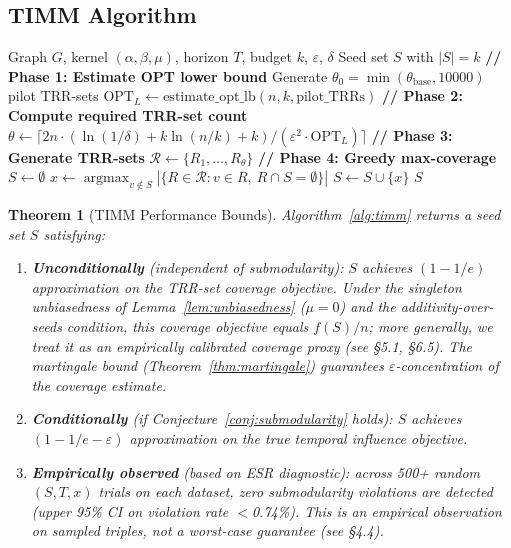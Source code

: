 \documentclass[10pt,conference]{IEEEtran}
\newtheorem{theorem}{Theorem}
\begin{document}
\subsection{TIMM Algorithm}

\begin{algorithm}[t]
\caption{TIMM}
\label{alg:timm}
\begin{algorithmic}[1]
\Require Graph $G$, kernel $(\alpha,\beta,\mu)$, horizon $T$, budget $k$, $\varepsilon$, $\delta$
\Ensure Seed set $S$ with $|S| = k$
\State \textbf{// Phase 1: Estimate OPT lower bound}
\State Generate $\theta_0 = \min(\theta_{\text{base}}, 10000)$ pilot TRR-sets
\State $\text{OPT}_L \gets \text{estimate\_opt\_lb}(n, k, \text{pilot\_TRRs})$
\State \textbf{// Phase 2: Compute required TRR-set count}
\State $\theta \gets \lceil 2n \cdot (\ln(1/\delta) + k\ln(n/k) + k) / (\varepsilon^2 \cdot \text{OPT}_L) \rceil$
\State \textbf{// Phase 3: Generate TRR-sets}
\State $\mathcal{R} \gets \{R_1, \ldots, R_\theta\}$ 
\State \textbf{// Phase 4: Greedy max-coverage}
\State $S \gets \emptyset$
\State $x \gets \operatorname{argmax}_{v \notin S} |\{R \in \mathcal{R} : v \in R,\ R \cap S = \emptyset\}|$
\State $S \gets S \cup \{x\}$
\EndFor
\State \Return $S$
\end{algorithmic}
\end{algorithm}

\begin{theorem}[TIMM Performance Bounds]
\label{thm:timm_guarantee}
Algorithm~\ref{alg:timm} returns a seed set $S$ satisfying:
\begin{enumerate}
\item \textbf{Unconditionally} (independent of submodularity): $S$ achieves $(1-1/e)$ approximation on the TRR-set coverage objective. Under the singleton unbiasedness of Lemma~\ref{lem:unbiasedness} ($\mu{=}0$) and the additivity-over-seeds condition, this coverage objective equals $f(S)/n$; more generally, we treat it as an empirically calibrated coverage proxy (see \S5.1, \S6.5). The martingale bound (Theorem~\ref{thm:martingale}) guarantees $\varepsilon$-concentration of the coverage estimate.
\item \textbf{Conditionally} (if Conjecture~\ref{conj:submodularity} holds): $S$ achieves $(1-1/e-\varepsilon)$ approximation on the true temporal influence objective.
\item \textbf{Empirically observed} (based on ESR diagnostic): across 500+ random $(S,T,x)$ trials on each dataset, \emph{zero} submodularity violations are detected (upper 95\% CI on violation rate $<$0.74\%). This is an empirical observation on sampled triples, not a worst-case guarantee (see \S4.4).
\end{enumerate}
\end{theorem}
\end{document}
